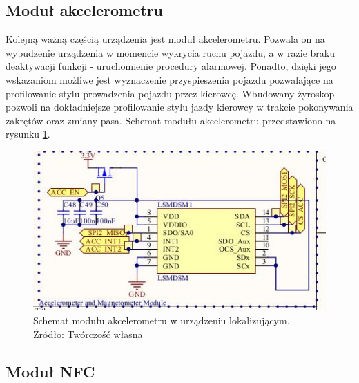 \subsection{Moduł akcelerometru}

Kolejną ważną częścią urządzenia jest moduł akcelerometru. Pozwala on na wybudzenie urządzenia w momencie wykrycia ruchu pojazdu, a w razie braku deaktywacji funkcji - uruchomienie procedury alarmowej. Ponadto, dzięki jego wskazaniom możliwe jest wyznaczenie przyspieszenia pojazdu pozwalające na profilowanie stylu prowadzenia pojazdu przez kierowcę. Wbudowany żyroskop pozwoli na dokładniejsze profilowanie stylu jazdy kierowcy w trakcie pokonywania zakrętów oraz zmiany pasa.
Schemat modułu akcelerometru przedstawiono na rysunku \ref{fig:image_mainboard_functional_accelerometer}.

\begin{figure}[H]
	\centering
	\includegraphics[width=15cm]{img/schematics/mainboard_functional_accelerometer.jpg}
	\caption{Schemat modułu akcelerometru w urządzeniu lokalizującym. \\ Źródło: Twórczość własna}
	\label{fig:image_mainboard_functional_accelerometer}
\end{figure}

\subsection{Moduł NFC}

